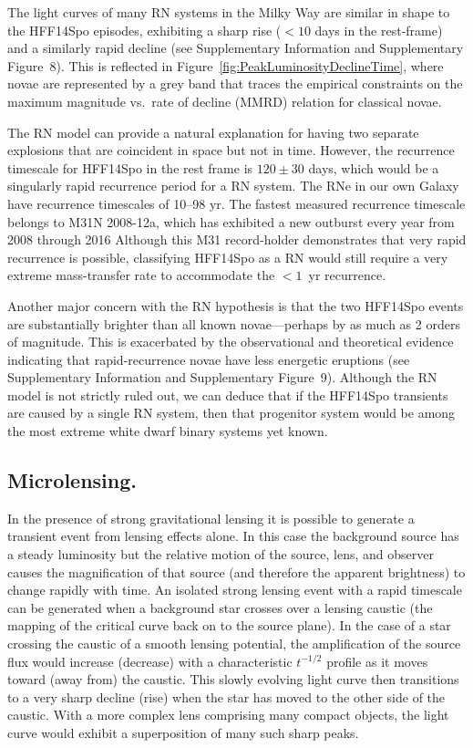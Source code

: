 \documentclass{article}
\def\spock{HFF14Spo\xspace}
\begin{document}
The light curves of many RN systems in the Milky Way are similar in
shape to the \spock episodes, exhibiting a sharp rise ($<10$ days in
the rest-frame) and a similarly rapid decline (see Supplementary
Information and Supplementary
Figure~8).  This is
reflected in Figure~\ref{fig:PeakLuminosityDeclineTime}, where novae
are represented by a grey band that traces the empirical constraints
on the maximum magnitude vs.\ rate of decline (MMRD) relation for
classical novae\cite{DellaValle:1995, Downes:2000}.

The RN model can provide a natural explanation for having two separate
explosions that are coincident in space but not in time.  However, the
recurrence timescale for \spock in the rest frame is $120\pm30$ days,
which would be a singularly rapid recurrence period for a RN system.
The RNe in our own Galaxy have recurrence timescales of 10--98
yr\cite{Schaefer:2010}.  The fastest measured recurrence timescale
belongs to M31N 2008-12a, which has exhibited a new outburst every
year from 2008 through 2016\cite{Tang:2014, Darnley:2016}
Although this M31 record-holder demonstrates that very rapid
recurrence is possible, classifying \spock as a RN would still require
a very extreme mass-transfer rate to accommodate the $<1$~yr
recurrence.

Another major concern with the RN hypothesis is that the two \spock
events are substantially brighter than all known novae---perhaps by as
much as 2 orders of magnitude.  This is exacerbated by the
observational and theoretical evidence indicating that
rapid-recurrence novae have less energetic eruptions\cite{Yaron:2005}
(see Supplementary Information and Supplementary Figure~9). Although
the RN model is not strictly ruled out, we can deduce that if the
\spock transients are caused by a single RN system, then that
progenitor system would be among the most extreme white dwarf binary
systems yet known.

\subsection{Microlensing.}\label{sec:MicroLensing}

In the presence of strong gravitational lensing it is possible to
generate a transient event from lensing effects alone.  In this case
the background source has a steady luminosity but the relative motion
of the source, lens, and observer causes the magnification of that
source (and therefore the apparent brightness) to change rapidly with
time.  An isolated strong lensing event with a rapid timescale can be
generated when a background star crosses over a lensing caustic (the
mapping of the critical curve back on to the source plane).  In the
case of a star crossing the caustic of a smooth lensing potential, the
amplification of the source flux would increase (decrease) with a
characteristic $t^{-1/2}$ profile as it moves toward (away from) the
caustic. This slowly evolving light curve then transitions to a very
sharp decline (rise) when the star has moved to the other side of the
caustic\cite{Schneider:1986, MiraldaEscude:1991}.  With a more complex
lens comprising many compact objects, the light curve would exhibit a
superposition of many such sharp peaks\cite{Lewis:1993, Diego:2017}.
\end{document}
